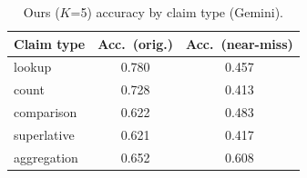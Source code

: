 \begin{table}[t]
\centering
\caption{Ours ($K$=5) accuracy by claim type (Gemini).}
\label{tab:per-claim-type}
\begin{tabular}{lcc}
\toprule
Claim type & Acc.\ (orig.) & Acc.\ (near-miss) \\
\midrule
lookup & 0.780 & 0.457 \\
count & 0.728 & 0.413 \\
comparison & 0.622 & 0.483 \\
superlative & 0.621 & 0.417 \\
aggregation & 0.652 & 0.608 \\
\bottomrule
\end{tabular}
\end{table}
